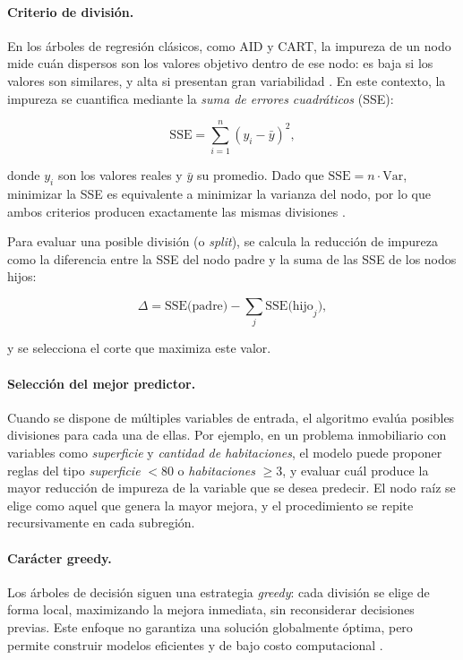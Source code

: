 \paragraph{Criterio de división.}
En los árboles de regresión clásicos, como AID y CART, la impureza de un nodo
mide cuán dispersos son los valores objetivo dentro de ese nodo: es baja si
los valores son similares, y alta si presentan gran variabilidad
\cite{breiman2017classification}. En este contexto, la impureza se cuantifica
mediante la \textit{suma de errores cuadráticos} (SSE):

\[
\text{SSE} = \sum_{i=1}^{n} (y_i - \bar{y})^2,
\]

donde $y_i$ son los valores reales y $\bar{y}$ su promedio. Dado que
$\text{SSE} = n \cdot \text{Var}$, minimizar la SSE es equivalente a
minimizar la varianza del nodo, por lo que ambos criterios producen
exactamente las mismas divisiones \cite{loh2011classification}.

Para evaluar una posible división (o \textit{split}), se calcula la reducción
de impureza como la diferencia entre la SSE del nodo padre y la suma de las
SSE de los nodos hijos:

\[
\Delta = \text{SSE(padre)} - \sum_j \text{SSE(hijo}_j),
\]

y se selecciona el corte que maximiza este valor.

\paragraph{Selección del mejor predictor.}
Cuando se dispone de múltiples variables de entrada, el algoritmo evalúa
posibles divisiones para cada una de ellas. Por ejemplo, en un problema
inmobiliario con variables como \textit{superficie} y \textit{cantidad de
habitaciones}, el modelo puede proponer
reglas del tipo \textit{superficie} $< 80$ o \textit{habitaciones} $\ge 3$, 
y evaluar cuál produce la mayor reducción de impureza de la variable que se 
desea predecir. El nodo raíz se elige como aquel que genera la mayor mejora, 
y el procedimiento se repite recursivamente en cada subregión.

\paragraph{Carácter greedy.}
Los árboles de decisión siguen una estrategia \textit{greedy}: cada división
se elige de forma local, maximizando la mejora inmediata, sin reconsiderar
decisiones previas. Este enfoque no garantiza una solución globalmente
óptima, pero permite construir modelos eficientes y de bajo costo
computacional \cite{breiman2017classification}.

